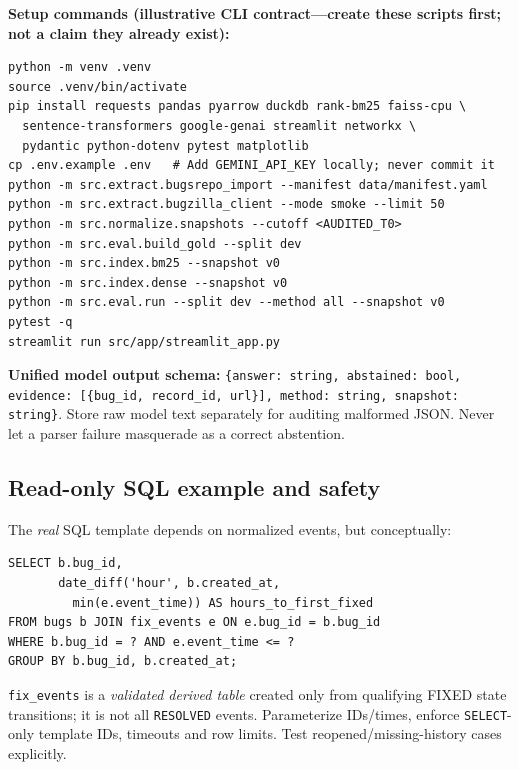 \documentclass[11pt,a4paper]{article}
\begin{document}
\textbf{Setup commands (illustrative CLI contract---create these scripts first; not a claim they already exist):}
\begin{lstlisting}
python -m venv .venv
source .venv/bin/activate
pip install requests pandas pyarrow duckdb rank-bm25 faiss-cpu \
  sentence-transformers google-genai streamlit networkx \
  pydantic python-dotenv pytest matplotlib
cp .env.example .env   # Add GEMINI_API_KEY locally; never commit it
python -m src.extract.bugsrepo_import --manifest data/manifest.yaml
python -m src.extract.bugzilla_client --mode smoke --limit 50
python -m src.normalize.snapshots --cutoff <AUDITED_T0>
python -m src.eval.build_gold --split dev
python -m src.index.bm25 --snapshot v0
python -m src.index.dense --snapshot v0
python -m src.eval.run --split dev --method all --snapshot v0
pytest -q
streamlit run src/app/streamlit_app.py
\end{lstlisting}

\textbf{Unified model output schema:} \texttt{\{answer: string, abstained: bool, evidence: [\{bug\_id, record\_id, url\}], method: string, snapshot: string\}}. Store raw model text separately for auditing malformed JSON. Never let a parser failure masquerade as a correct abstention.

\subsection{Read-only SQL example and safety}
The \emph{real} SQL template depends on normalized events, but conceptually:
\begin{lstlisting}
SELECT b.bug_id,
       date_diff('hour', b.created_at,
         min(e.event_time)) AS hours_to_first_fixed
FROM bugs b JOIN fix_events e ON e.bug_id = b.bug_id
WHERE b.bug_id = ? AND e.event_time <= ?
GROUP BY b.bug_id, b.created_at;
\end{lstlisting}
\texttt{fix\_events} is a \emph{validated derived table} created only from qualifying FIXED state transitions; it is not all \texttt{RESOLVED} events. Parameterize IDs/times, enforce \texttt{SELECT}-only template IDs, timeouts and row limits. Test reopened/missing-history cases explicitly.
\end{document}
